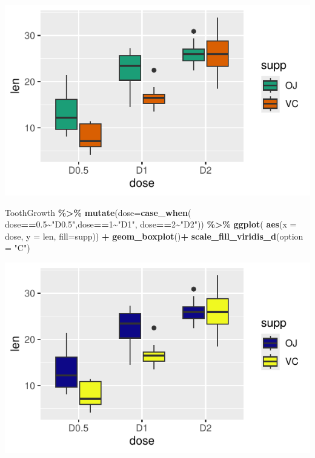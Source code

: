 \documentclass[
]{book}
\newenvironment{Shaded}{\begin{snugshade}}{\end{snugshade}}
\newcommand{\AttributeTok}[1]{\textcolor[rgb]{0.13,0.29,0.53}{#1}}
\newcommand{\DecValTok}[1]{\textcolor[rgb]{0.00,0.00,0.81}{#1}}
\newcommand{\FloatTok}[1]{\textcolor[rgb]{0.00,0.00,0.81}{#1}}
\newcommand{\FunctionTok}[1]{\textcolor[rgb]{0.13,0.29,0.53}{\textbf{#1}}}
\newcommand{\NormalTok}[1]{#1}
\newcommand{\SpecialCharTok}[1]{\textcolor[rgb]{0.81,0.36,0.00}{\textbf{#1}}}
\newcommand{\StringTok}[1]{\textcolor[rgb]{0.31,0.60,0.02}{#1}}
\begin{document}
\begin{center}\includegraphics{R_Manual_files/figure-latex/unnamed-chunk-215-1} \end{center}

\begin{Shaded}
\begin{Highlighting}[]
\NormalTok{ToothGrowth }\SpecialCharTok{\%\textgreater{}\%}  \FunctionTok{mutate}\NormalTok{(}\AttributeTok{dose=}\FunctionTok{case\_when}\NormalTok{(}
\NormalTok{  dose}\SpecialCharTok{==}\FloatTok{0.5}\SpecialCharTok{\textasciitilde{}}\StringTok{"D0.5"}\NormalTok{,dose}\SpecialCharTok{==}\DecValTok{1}\SpecialCharTok{\textasciitilde{}}\StringTok{"D1"}\NormalTok{, dose}\SpecialCharTok{==}\DecValTok{2}\SpecialCharTok{\textasciitilde{}}\StringTok{"D2"}\NormalTok{)) }\SpecialCharTok{\%\textgreater{}\%} \FunctionTok{ggplot}\NormalTok{(}
    \FunctionTok{aes}\NormalTok{(}\AttributeTok{x =}\NormalTok{ dose, }\AttributeTok{y =}\NormalTok{ len, }\AttributeTok{fill=}\NormalTok{supp)) }\SpecialCharTok{+}  \FunctionTok{geom\_boxplot}\NormalTok{()}\SpecialCharTok{+}
  \FunctionTok{scale\_fill\_viridis\_d}\NormalTok{(}\AttributeTok{option =} \StringTok{"C"}\NormalTok{)}
\end{Highlighting}
\end{Shaded}

\begin{center}\includegraphics{R_Manual_files/figure-latex/unnamed-chunk-215-2} \end{center}
\end{document}
